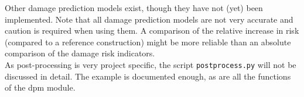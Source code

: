 \documentclass{article}
\newcommand{\code}[1]{{\small\texttt{#1}}}
\begin{document}
Other damage prediction models exist, though they have not (yet) been implemented. Note that all damage prediction models are not very accurate and caution is required when using them. A comparison of the relative increase in risk (compared to a reference construction) might be more reliable than an absolute comparison of the damage risk indicators. \\
As post-processing is very project specific, the script \code{postprocess.py} will not be discussed in detail. The example is documented enough, as are all the functions of the dpm module.

\newpage
{}


\end{document}

